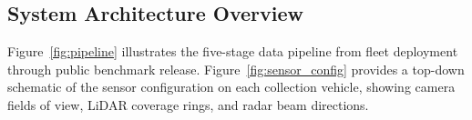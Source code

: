 
\subsection{System Architecture Overview}
\label{ssec:arch_overview}

Figure~\ref{fig:pipeline} illustrates the five-stage \lucid{} data pipeline from
fleet deployment through public benchmark release. Figure~\ref{fig:sensor_config}
provides a top-down schematic of the sensor configuration on each collection vehicle,
showing camera fields of view, LiDAR coverage rings, and radar beam directions.

